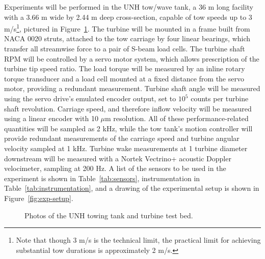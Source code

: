 Experiments will be performed in the UNH tow/wave tank, a 36 m long facility
with a 3.66 m wide by 2.44 m deep cross-section, capable of tow speeds up to 3
m/s\footnote{Note that though 3 m/s is the technical limit, the practical limit
    for achieving substantial tow durations is approximately 2 m/s.}, pictured in
Figure~\ref{fig:tow-tank}. The turbine will be mounted in a frame built from
NACA 0020 struts, attached to the tow carriage by four linear bearings, which
transfer all streamwise force to a pair of S-beam load cells. The turbine shaft
RPM will be controlled by a servo motor system, which allows prescription of the
turbine tip speed ratio. The load torque will be measured by an inline rotary
torque transducer and a load cell mounted at a fixed distance from the servo
motor, providing a redundant measurement. Turbine shaft angle will be measured
using the servo drive's emulated encoder output, set to $10^5$ counts per
turbine shaft revolution. Carriage speed, and therefore inflow velocity will be
measured using a linear encoder with 10 $\mu$m resolution. All of these
performance-related quantities will be sampled as 2 kHz, while the tow tank's
motion controller will provide redundant measurements of the carriage speed and
turbine angular velocity sampled at 1 kHz. Turbine wake measurements at 1
turbine diameter downstream will be measured with a Nortek Vectrino+ acoustic
Doppler velocimeter, sampling at 200 Hz. A list of the sensors to be used in the
experiment is shown in Table~\ref{tab:sensors}, instrumentation in
Table~\ref{tab:instrumentation}, and a drawing of the experimental setup is
shown in Figure~\ref{fig:exp-setup}.


\begin{figure}[ht!]
    \centering 
    \caption{Photos of the UNH towing tank and turbine test bed.} 
    \label{fig:tow-tank}
\end{figure}


